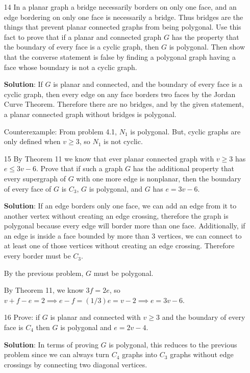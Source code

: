 \documentclass{article}
\begin{document}
\begin{enumerate}
	\item[14] In a planar graph a bridge necessarily borders on only one face, and an edge bordering on only one face is necessarily a bridge. Thus bridges are the things that prevent planar connected graphs from being polygonal. Use this fact to prove that if a planar and connected graph $G$ has the property that the boundary of every face is a cyclic graph, then $G$ is polygonal. Then show that the converse statement is false by finding a polygonal graph having a face whose boundary is not a cyclic graph.
	
	\textbf{Solution}: If $G$ is planar and connected, and the boundary of every face is a cyclic graph, then every edge on any face borders two faces by the Jordan Curve Theorem. Therefore there are no bridges, and by the given statement, a planar connected graph without bridges is polygonal.
	
	Counterexample: From problem 4.1, $N_1$ is polygonal. But, cyclic graphs are only defined when $v \geq 3$, so $N_1$ is not cyclic.
	
	\item[15] By Theorem 11 we know that ever planar connected graph with $v \geq 3$ has $e \leq 3v - 6$. Prove that if such a graph $G$ has the additional property that every supergraph of $G$ with one more edge is nonplanar, then the boundary of every face of $G$ is $C_3$, $G$ is polygonal, and $G$ has $e = 3v - 6$.
	
	\textbf{Solution}: If an edge borders only one face, we can add an edge from it to another vertex without creating an edge crossing, therefore the graph is polygonal because every edge will border more than one face. Additionally, if an edge is inside a face bounded by more than 3 vertices, we can connect to at least one of those vertices without creating an edge crossing. Therefore every border must be $C_3$.
	
	By the previous problem, $G$ must be polygonal.
	
	By Theorem 11, we know $3f = 2e$, so $v + f - e = 2 \implies e - f = (1/3)e = v - 2 \implies e = 3v - 6$.

	\item[16] Prove: if $G$ is planar and connected with $v \geq 3$ and the boundary of every face is $C_4$ then $G$ is polygonal  and $e = 2v - 4$.
	
	\textbf{Solution}: In terms of proving $G$ is polygonal, this reduces to the previous problem since we can always turn $C_4$ graphs into $C_3$ graphs without edge crossings by connecting two diagonal vertices.
	

\end{enumerate}
\end{document}

